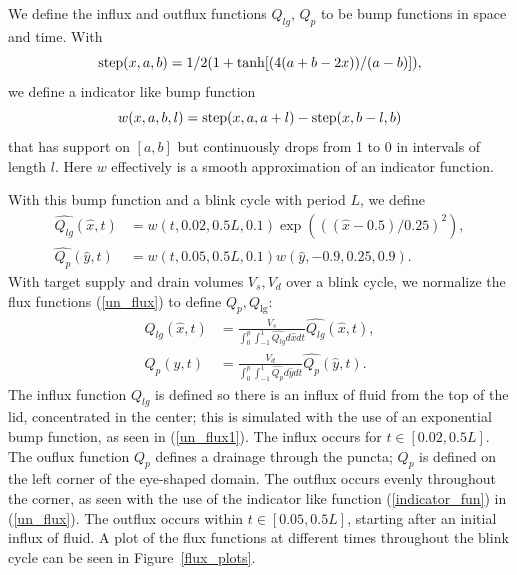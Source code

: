 %
%
\label{sec:flux}

We define the influx and outflux functions $Q_{lg}$, $Q_{p}$ to be bump functions in space and time. With
\begin{equation}
\operatorname{step}(x,a,b) = 1/2 (1 + \tanh[(4 (a + b - 2 x))/(a - b)]),
\end{equation}
we define a indicator like bump function
\begin{equation}
w(x,a,b,l) = \operatorname{step}(x,a,a+l)-\operatorname{step}(x,b-l,b)
\label{indicator_fun}
\end{equation}
that has support on $[a,b]$ but continuously drops from 1 to 0 in intervals of length $l$. Here $w$ effectively is a smooth approximation of an indicator function. 

 With this bump function and a blink cycle with period $L$, we define
\begin{eqnarray}
\hat{Q_{lg}}(\hat{x},t) &= w(t,0.02,0.5 L,0.1) \exp(((\hat{x}-0.5)/0.25)^2), \label{bumb_funs}  \\
\hat{Q_{p}}(\hat{y},t) &= w(t,0.05,0.5 L,0.1) w(\hat{y},-0.9,0.25,0.9). 
\end{eqnarray}
With target supply and drain volumes $V_s, V_d$ over a blink cycle, we normalize the flux functions (\ref{un_flux}) to define $Q_p,Q_{\lg}$:
\begin{eqnarray}
Q_{lg}(\hat{x},t) &= \frac{V_s}{\int_{0}^{p} \int_{-1}^1 \hat{Q_{lg}} d\hat{x} dt} \hat{Q_{lg}}(\hat{x},t), \label{un_flux1} \\
Q_{p}(\hat{y},t) &= \frac{V_d}{\int_{0}^{p} \int_{-1}^1 \hat{Q_{p}} d\hat{y} dt} \hat{Q_{p}}(\hat{y},t).
\label{un_flux}
\end{eqnarray}
The influx function $Q_{lg}$ is defined so there is an influx of fluid from the top of the lid, concentrated in the center; this is simulated with the use of an exponential bump function, as seen in (\ref{un_flux1}). The influx occurs for $t \in [0.02,0.5 L]$. The ouflux function $Q_p$ defines a drainage through the puncta; $Q_p$ is defined on the left corner of the eye-shaped domain. The outflux occurs evenly throughout the corner, as seen with the use of the indicator like function (\ref{indicator_fun})  in (\ref{un_flux}). The outflux occurs within $t \in [0.05,0.5 L]$, starting after an initial influx of fluid. A plot of the flux functions at different times throughout the blink cycle can be seen in Figure~\ref{flux_plots}.

